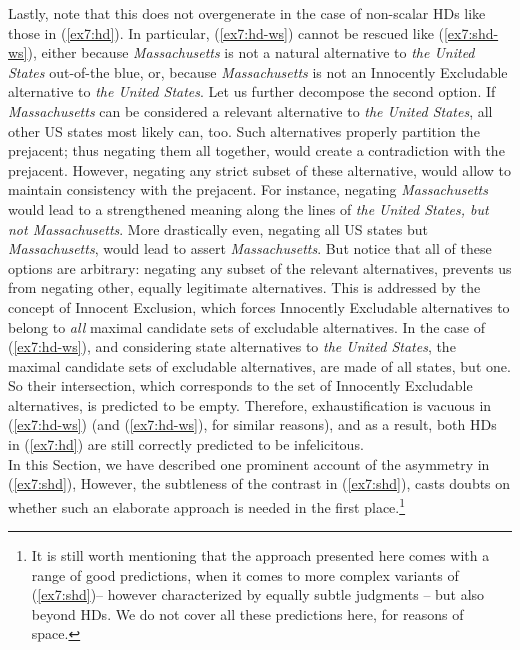 Lastly, note that this does not overgenerate in the case of non-scalar HDs like those in (\ref{ex7:hd}). In particular, (\ref{ex7:hd-ws}) cannot be rescued like (\ref{ex7:shd-ws}), either because \textit{Massachusetts} is not a natural alternative to \textit{the United States} out-of-the blue, or, because \textit{Massachusetts} is not an Innocently Excludable alternative to \textit{the United States}. Let us further decompose the second option. If \textit{Massachusetts} can be considered a relevant alternative to \textit{the United States}, all other US states most likely can, too. Such alternatives properly partition the prejacent; thus negating them all together, would create a contradiction with the prejacent. However, negating any strict subset of these alternative, would allow to maintain consistency with the prejacent. For instance, negating \textit{Massachusetts} would lead to a strengthened meaning along the lines of \textit{the United States, but not Massachusetts}. More drastically even, negating all US states but \textit{Massachusetts}, would lead to assert \textit{Massachusetts}. But notice that all of these options are arbitrary: negating any subset of the relevant alternatives, prevents us from negating other, equally legitimate alternatives. This is addressed by the concept of Innocent Exclusion, which forces Innocently Excludable alternatives to belong to \textit{all} maximal candidate sets of excludable alternatives. In the case of (\ref{ex7:hd-ws}), and considering state alternatives to \textit{the United States}, the maximal candidate sets of excludable alternatives, are made of all states, but one. So their intersection, which corresponds to the set of Innocently Excludable alternatives, is predicted to be empty. Therefore, exhaustification is vacuous in (\ref{ex7:hd-ws}) (and (\ref{ex7:hd-ws}), for similar reasons), and as a result, both HDs in (\ref{ex7:hd}) are still correctly predicted to be infelicitous.\\

In this Section, we have described one prominent account of the asymmetry in (\ref{ex7:shd}), However, the subtleness of the contrast in (\ref{ex7:shd}), casts doubts on whether such an elaborate approach is needed in the first place.\footnote{It is still worth mentioning that the approach presented here comes with a range of good predictions, when it comes to more complex variants of (\ref{ex7:shd})-- however characterized by equally subtle judgments -- but also beyond HDs. We do not cover all these predictions here, for reasons of space.}
